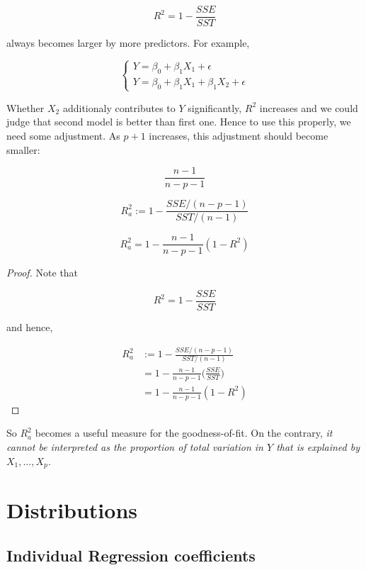 \documentclass[]{book}
\theoremstyle{definition}
\theoremstyle{definition}
\theoremstyle{definition}
\theoremstyle{remark}
\let\BeginKnitrBlock\begin \let\EndKnitrBlock\end
\begin{document}
\[R^2 = 1 - \frac{SSE}{SST}\]

always becomes larger by more predictors. For example,

\[
\begin{cases}
  Y = \beta_0 + \beta_1 X_1 + \epsilon \\
  Y = \beta_0 + \beta_1 X_1 + \beta_1 X_2 + \epsilon
\end{cases}
\]

Whether \(X_2\) additionaly contributes to \(Y\) significantly, \(R^2\) increases and we could judge that second model is better than first one. Hence to use this properly, we need some adjustment. As \(p + 1\) increases, this adjustment should become smaller:

\[\frac{n - 1}{n - p - 1}\]

\BeginKnitrBlock{definition}[Adjusted Rsquared]
\protect\hypertarget{def:ra}{}{\label{def:ra} {} }\[R_a^2 := 1 - \frac{SSE / (n - p - 1)}{SST / (n - 1)}\]
\EndKnitrBlock{definition}

\BeginKnitrBlock{remark}[Adjustment]
{}\[R_a^2 = 1 - \frac{n - 1}{n - p - 1}(1 - R^2)\]
\EndKnitrBlock{remark}

\BeginKnitrBlock{proof}
{}Note that

\[R^2 = 1 - \frac{SSE}{SST}\]

and hence,

\begin{equation*}
  \begin{split}
    R_a^2 & := 1 - \frac{SSE / (n - p - 1)}{SST / (n - 1)} \\
    & = 1 - \frac{n - 1}{n - p - 1}\bigg(\frac{SSE}{SST}\bigg) \\
    & = 1 - \frac{n - 1}{n - p - 1}(1 - R^2)
  \end{split}
\end{equation*}
\EndKnitrBlock{proof}

So \(R_a^2\) becomes a useful measure for the goodness-of-fit. On the contrary, \emph{it cannot be interpreted as the proportion of total variation in \(Y\) that is explained by \(X_1, \ldots, X_p\).}

\hypertarget{distributions-1}{%
\section{Distributions}\label{distributions-1}}

\hypertarget{individual-regression-coefficients}{%
\subsection{Individual Regression coefficients}\label{individual-regression-coefficients}}
\end{document}
